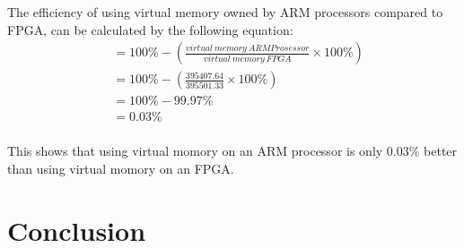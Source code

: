 
The efficiency of using virtual memory owned by ARM processors compared to FPGA, can be calculated by the following equation:
\begin{equation*}
    \begin{split}
& = 100\% - \left( \frac{virtual\ memory\ ARM Prosessor}{virtual\ memory\ FPGA} \times 100\% \right) \\
& = 100\% - \left( \frac{395407.64}{395501.33} \times 100\% \right) \\
& = 100\% - 99.97\% \\
& = 0.03\% \\
    \end{split}
\end{equation*}


This shows that using virtual momory on an ARM processor is only 0.03\% better than using virtual momory on an FPGA.

\section{Conclusion}


